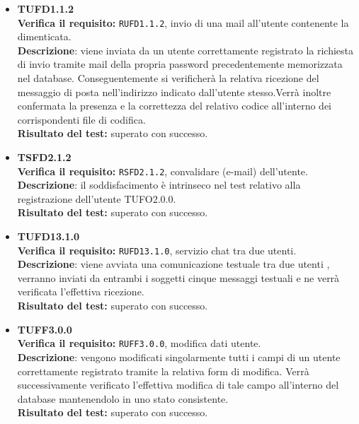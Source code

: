 \begin{itemize}
\item \textbf{TUFD1.1.2}\\
\textbf{Verifica il requisito:} \texttt{RUFD1.1.2}, invio di una mail all'utente contenente la  dimenticata.\\
\textbf{Descrizione}: viene inviata da un utente  correttamente registrato la richiesta di invio tramite mail della propria password precedentemente memorizzata nel database. Conseguentemente si verificherà la relativa ricezione del messaggio di posta nell'indirizzo indicato dall'utente stesso.Verrà inoltre confermata la presenza e la correttezza del relativo codice all'interno dei corrispondenti file di codifica.\\
\textbf{Risultato del test:} superato con successo.

\item \textbf{TSFD2.1.2}\\ 
\textbf{Verifica il requisito:} \texttt{RSFD2.1.2}, convalidare  (e-mail) dell'utente.\\
\textbf{Descrizione}: il soddisfacimento è intrinseco nel test relativo alla registrazione dell'utente TUFO2.0.0.\\
\textbf{Risultato del test:} superato con successo.

\item \textbf{TUFD13.1.0}\\
\textbf{Verifica il requisito:} \texttt{RUFD13.1.0}, servizio chat tra due utenti.\\
\textbf{Descrizione}: viene avviata una comunicazione testuale tra due utenti , verranno inviati da entrambi i soggetti cinque messaggi testuali e ne verrà verificata l'effettiva ricezione.\\
\textbf{Risultato del test:} superato con successo.

\item \textbf{TUFF3.0.0}\\
\textbf{Verifica il requisito:} \texttt{RUFF3.0.0}, modifica dati utente.\\
\textbf{Descrizione}: vengono modificati singolarmente tutti i campi di un utente  correttamente registrato tramite la relativa form di modifica. Verrà successivamente verificato l'effettiva modifica di tale campo all'interno del database mantenendolo in uno stato consistente.\\
\textbf{Risultato del test:} superato con successo.


\end{itemize}
